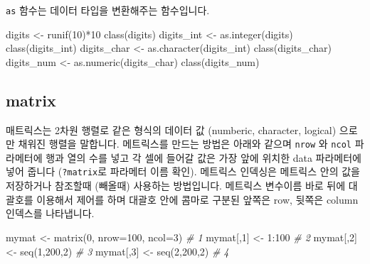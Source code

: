 \documentclass[
]{book}
\newenvironment{Shaded}{\begin{snugshade}}{\end{snugshade}}
\newcommand{\AttributeTok}[1]{\textcolor[rgb]{0.77,0.63,0.00}{#1}}
\newcommand{\CommentTok}[1]{\textcolor[rgb]{0.56,0.35,0.01}{\textit{#1}}}
\newcommand{\DecValTok}[1]{\textcolor[rgb]{0.00,0.00,0.81}{#1}}
\newcommand{\FunctionTok}[1]{\textcolor[rgb]{0.00,0.00,0.00}{#1}}
\newcommand{\NormalTok}[1]{#1}
\newcommand{\OtherTok}[1]{\textcolor[rgb]{0.56,0.35,0.01}{#1}}
\newcommand{\SpecialCharTok}[1]{\textcolor[rgb]{0.00,0.00,0.00}{#1}}
\begin{document}
\texttt{as} 함수는 데이터 타입을 변환해주는 함수입니다.

\begin{Shaded}
\begin{Highlighting}[]
\NormalTok{digits }\OtherTok{\textless{}{-}} \FunctionTok{runif}\NormalTok{(}\DecValTok{10}\NormalTok{)}\SpecialCharTok{*}\DecValTok{10}
\FunctionTok{class}\NormalTok{(digits)}
\NormalTok{digits\_int }\OtherTok{\textless{}{-}} \FunctionTok{as.integer}\NormalTok{(digits)}
\FunctionTok{class}\NormalTok{(digits\_int)}
\NormalTok{digits\_char }\OtherTok{\textless{}{-}} \FunctionTok{as.character}\NormalTok{(digits\_int)}
\FunctionTok{class}\NormalTok{(digits\_char)}
\NormalTok{digits\_num }\OtherTok{\textless{}{-}} \FunctionTok{as.numeric}\NormalTok{(digits\_char)}
\FunctionTok{class}\NormalTok{(digits\_num)}
\end{Highlighting}
\end{Shaded}

\hypertarget{matrix}{%
\subsection{matrix}\label{matrix}}

매트릭스는 2차원 행렬로 같은 형식의 데이터 값 (numberic, character, logical) 으로만 채워진 행렬을 말합니다. 메트릭스를 만드는 방법은 아래와 같으며 \texttt{nrow} 와 \texttt{ncol} 파라메터에 행과 열의 수를 넣고 각 셀에 들어갈 값은 가장 앞에 위치한 data 파라메터에 넣어 줍니다 (\texttt{?matrix}로 파라메터 이름 확인). 메트릭스 인덱싱은 메트릭스 안의 값을 저장하거나 참조할때 (빼올때) 사용하는 방법입니다. 메트릭스 변수이름 바로 뒤에 대괄호를 이용해서 제어를 하며 대괄호 안에 콤마로 구분된 앞쪽은 row, 뒷쪽은 column 인덱스를 나타냅니다.

\begin{Shaded}
\begin{Highlighting}[]
\NormalTok{mymat }\OtherTok{\textless{}{-}} \FunctionTok{matrix}\NormalTok{(}\DecValTok{0}\NormalTok{, }\AttributeTok{nrow=}\DecValTok{100}\NormalTok{, }\AttributeTok{ncol=}\DecValTok{3}\NormalTok{) }\CommentTok{\# 1}
\NormalTok{mymat[,}\DecValTok{1}\NormalTok{] }\OtherTok{\textless{}{-}} \DecValTok{1}\SpecialCharTok{:}\DecValTok{100} \CommentTok{\# 2}
\NormalTok{mymat[,}\DecValTok{2}\NormalTok{] }\OtherTok{\textless{}{-}} \FunctionTok{seq}\NormalTok{(}\DecValTok{1}\NormalTok{,}\DecValTok{200}\NormalTok{,}\DecValTok{2}\NormalTok{) }\CommentTok{\# 3}
\NormalTok{mymat[,}\DecValTok{3}\NormalTok{] }\OtherTok{\textless{}{-}} \FunctionTok{seq}\NormalTok{(}\DecValTok{2}\NormalTok{,}\DecValTok{200}\NormalTok{,}\DecValTok{2}\NormalTok{) }\CommentTok{\# 4}
\end{Highlighting}
\end{Shaded}
\end{document}

